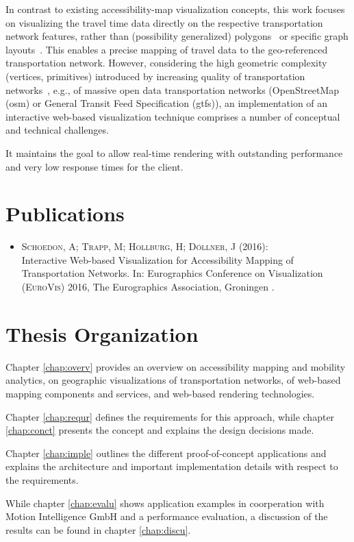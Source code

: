     In contrast to existing accessibility-map visualization concepts, this work
    focuses on visualizing the travel time data directly on the respective
    transportation network features, rather than (possibility generalized)
    polygons~\cite{Glander2010} or specific graph layouts~\cite{Krause2012}.
    This enables a precise mapping of travel data to the geo-referenced
    transportation network. However, considering the high geometric complexity
    (vertices, primitives) introduced by increasing quality of transportation
    networks~\cite{Zielstra2010}, e.g., of massive open data transportation
    networks (OpenStreetMap (\acrshort{osm}) or General Transit Feed
    Specification (\acrshort{gtfs})),
    an implementation of an interactive web-based visualization technique
    comprises a number of conceptual and technical challenges.\par

    It maintains the goal to allow real-time rendering with outstanding
    performance and very low response times for the client.\par


  \section{Publications}
    \label{sec:intro:publc}
    \begin{itemize}
      \item \textsc{Schoedon, A; Trapp, M; Hollburg, H; Döllner,
        J (2016)}:\\ Interactive Web-based Visualization for Accessibility
        Mapping of Transportation Networks. In: Eurographics Conference on
        Visualization (\textsc{EuroVis}) 2016, The Eurographics Association,
        Groningen \cite{STHD2016}.
    \end{itemize}

  \section{Thesis Organization}
    \label{sec:intro:organ}
    Chapter \ref{chap:overv} provides an overview on accessibility mapping and
    mobility analytics, on geographic visualizations of transportation networks,
    of web-based mapping components and services, and web-based rendering
    technologies.\par

    Chapter \ref{chap:requr} defines the requirements for this approach, while
    chapter \ref{chap:conct} presents the concept and explains the design
    decisions made.\par

    Chapter \ref{chap:imple} outlines the different proof-of-concept
    applications and explains the architecture and important implementation
    details with respect to the requirements.\par

    While chapter \ref{chap:evalu} shows application examples in coorperation
    with Motion Intelligence GmbH and a performance evaluation, a discussion of
    the results can be found in chapter \ref{chap:discu}.\par
